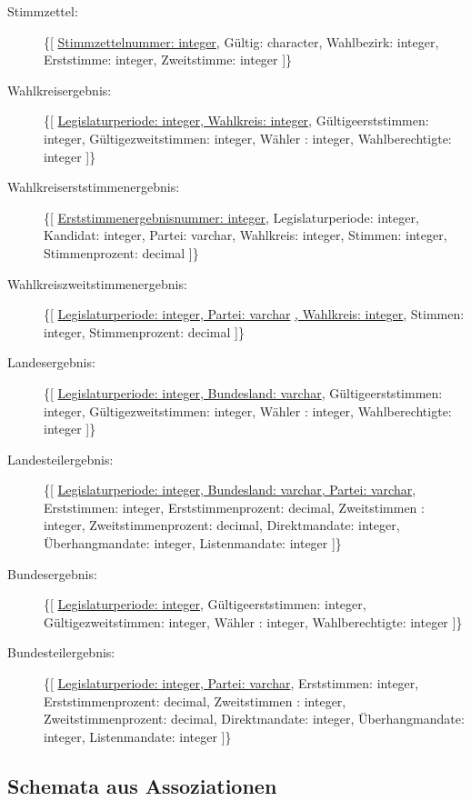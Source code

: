 \documentclass[a4paper]{article}
\begin{document}
\begin{description}
\item[Stimmzettel:] \{[ \underline{Stimmzettelnummer: integer}, Gültig: character, Wahlbezirk: integer, Erststimme: integer, Zweitstimme: integer ]\}

\item[Wahlkreisergebnis:] \{[ \underline{Legislaturperiode: integer, Wahlkreis: integer}, Gültigeerststimmen: integer, Gültigezweitstimmen: integer, Wähler : integer, Wahlberechtigte: integer ]\}

\item[Wahlkreiserststimmenergebnis:] \{[ \underline{Erststimmenergebnisnummer: integer}, Legislaturperiode: integer, Kandidat: integer, Partei: varchar, Wahlkreis: integer, Stimmen: integer, Stimmenprozent: decimal ]\}

\item[Wahlkreiszweitstimmenergebnis:] \{[ \underline{Legislaturperiode: integer, Partei: varchar} \underline{, Wahlkreis: integer}, Stimmen: integer, Stimmenprozent: decimal ]\}

\item[Landesergebnis:] \{[ \underline{Legislaturperiode: integer, Bundesland: varchar}, Gültigeerststimmen: integer, Gültigezweitstimmen: integer, Wähler : integer, Wahlberechtigte: integer ]\}

\item[Landesteilergebnis:] \{[ \underline{Legislaturperiode: integer, Bundesland: varchar, Partei: varchar}, Erststimmen: integer, Erststimmenprozent: decimal, Zweitstimmen : integer, Zweitstimmenprozent: decimal, Direktmandate: integer, Überhangmandate: integer, Listenmandate: integer ]\}

\item[Bundesergebnis:] \{[ \underline{Legislaturperiode: integer}, Gültigeerststimmen: integer, Gültigezweitstimmen: integer, Wähler : integer, Wahlberechtigte: integer ]\}

\item[Bundesteilergebnis:] \{[ \underline{Legislaturperiode: integer, Partei: varchar}, Erststimmen: integer, Erststimmenprozent: decimal, Zweitstimmen : integer, Zweitstimmenprozent: decimal, Direktmandate: integer, Überhangmandate: integer, Listenmandate: integer ]\}

\end{description}

\subsection{Schemata aus Assoziationen}
\end{document}
